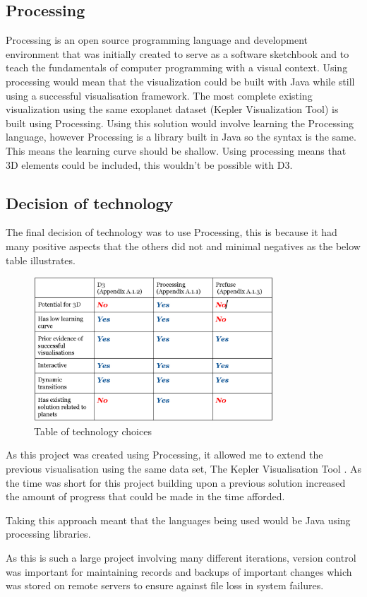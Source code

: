 \subsection{Processing}
Processing is an open source programming language and development environment
that was initially created to serve as a software
sketchbook and to teach the fundamentals of computer programming with a visual
context.
Using processing would mean that the visualization could be built with Java
while still using
a successful visualisation framework. The most complete existing visualization
using
the same exoplanet dataset (Kepler Visualization Tool) is built using
Processing.
Using this solution would involve learning the Processing language, however
Processing
is a library built in Java so the syntax is the same. This means the learning
curve should be shallow.
Using processing means that 3D elements could be included, this wouldn't be
possible with D3.

\subsection{Decision of technology}
The final decision of technology was to use Processing, this is because it had
many positive aspects that the others did not and minimal negatives as the below
table illustrates.
\clearpage
\begin{figure}[H]
  \centering
      \includegraphics[width=0.8\textwidth]{images/table_technologies.jpg}
  \caption{Table of technology choices}
\end{figure}

As this project was created using Processing, it allowed me to extend the
previous visualisation using the same data set, The Kepler Visualisation Tool
\cite{kepler_github, kepler_article}. As the time was short for this project
building upon a previous solution increased the amount of progress that could be
made in the time afforded.

Taking this approach meant that the languages being used would be Java using
processing libraries. 

As this is such a large project involving many different iterations, version
control was important for maintaining records and backups of important changes
which was stored on remote servers to ensure against file loss in system
failures.
